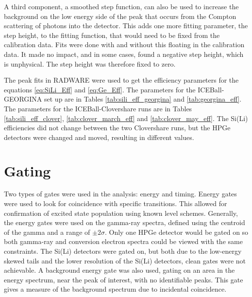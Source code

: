 A third component, a smoothed step function, can also be used to increase the background on the low energy side of the peak that occurs from the Compton scattering of photons into the detector. This adds one more fitting parameter, the step height, to the fitting function, that would need to be fixed from the calibration data. Fits were done with and without this floating in the calibration data. It made no impact, and in some cases, found a negative step height, which is unphysical. The step height was therefore fixed to zero.

The peak fits in RADWARE were used to get the efficiency parameters for the equations \ref{eq:SiLi_Eff} and \ref{eq:Ge_Eff}. The parameters for the ICEBall-GEORGINA set up are in Tables \ref{tab:sili_eff_georgina} and \ref{tab:georgina_eff}. The parameters for the ICEBall-Clovershare runs are in Tables \ref{tab:sili_eff_clover}, \ref{tab:clover_march_eff} and \ref{tab:clover_may_eff}. The Si(Li) efficiencies did not change between the two Clovershare runs, but the HPGe detectors were changed and moved, resulting in different values.











\section{Gating}
\label{sec:gating}

Two types of gates were used in the analysis: energy and timing. Energy gates were used to look for coincidence with specific transitions. This allowed for confirmation of excited state population using known level schemes. Generally, the energy gates were used on the gamma-ray spectra, defined using the centroid of the gamma and a range of $\pm2\sigma$. Only one HPGe detector would be gated on so both gamma-ray and conversion electron spectra could be viewed with the same constraints. The Si(Li) detectors were gated on, but both due to the low-energy skewed tails and the lower resolution of the Si(Li) detectors, clean gates were not achievable. A background energy gate was also used, gating on an area in the energy spectrum, near the peak of interest, with no identifiable peaks. This gate gives a measure of the background spectrum due to incidental coincidence. 

